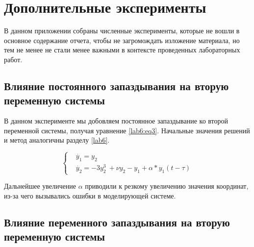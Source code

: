 \chapter{Дополнительные эксперименты}

В данном приложении собраны численные эксперименты, которые
не вошли в основное содержание отчета, чтобы не загромождать
изложение материала, но тем не менее не стали менее важными
в контексте проведенных лабораторных работ.

\section{Влияние постоянного запаздывания на вторую
переменную системы}

В данном эксперименте мы добовляем постоянное запаздывание
ко второй переменной системы, получая уравнение \ref{lab6:eq3}.
Начальные значения решений и метод аналогичны разделу \ref{lab6}.

\begin{equation}\label{lab6:eq3}
    \begin{cases}
        &\dot{y_1} = y_2\\
        &\dot{y_2} = -3y_2^3\ + \nu y_2 - y_1  + \alpha * y_1(t-\tau)
    \end{cases}
\end{equation}

\clearpage
{}
Дальнейшее увеличение $\alpha$ приводили к резкому увеличению значения координат,
из-за чего вызывались ошибки в моделирующей системе.

\section{Влияние переменного запаздывания на вторую
переменную системы}

